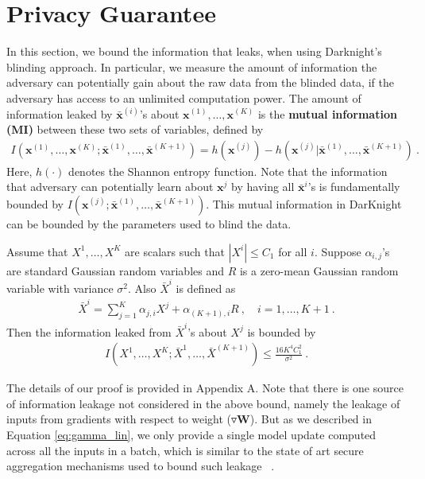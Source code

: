 \section{Privacy Guarantee}
\label{sec:guarantee}
In this section, we bound the information that leaks, when using Darknight's blinding approach. 
In particular, we measure the amount of information the adversary can potentially gain about the raw data from the blinded data, if the adversary has access to an unlimited computation power. The amount of information leaked by $\bar{\mathbf x}^{(i)}$'s about $\mathbf x^{(1)},\dots,\mathbf x^{(K)}$ is the \textbf{mutual information (MI)} between these two sets of variables, defined by~\citep{cover1999elements}
\begin{align}
    I(\mathbf x^{(1)},\dots,\mathbf x^{(K)} ; \bar{\mathbf x}^{(1)},\dots,\bar{\mathbf x}^{(K+1)})=h(\mathbf x^{(j)})-h(\mathbf x^{(j)} |\bar{\mathbf x}^{(1)},\dots,\bar{\mathbf x}^{(K+1)})~.
\end{align}
Here, $ h(\cdot)$ denotes the Shannon entropy function. Note that the information that adversary can potentially learn about $\mathbf x^j$ by having all $\bar{\mathbf x}^i$'s is fundamentally bounded by  $I(\mathbf x^{(j)} ; \bar{\mathbf x}^{(1)},\dots,\bar{\mathbf x}^{(K+1)})$.  This mutual information in DarKnight can be bounded by the parameters used to blind the data.
\begin{thm}\label{thm:info_leakage1}
Assume that $X^1,\dots,X^K$ are scalars such that $|X^i|\leq C_1$ for all $i$. Suppose $\alpha_{i,j}$'s are standard Gaussian random variables and $R$ is a zero-mean Gaussian random variable with variance $\sigma^2$. Also $\bar X^i$ is defined as
\begin{align}
    \bar X^i=\sum_{j=1}^K \alpha_{j,i} X^j + \alpha_{(K+1),i} R~,\quad i=1,\dots,K+1~.
\end{align}
Then the information leaked from $\bar X^i$'s about $X^j$ is bounded by
\begin{align}\label{eq:infor_bound}
    I\left(X^1,\dots,X^K ; \bar X^1,\dots,\bar X^{(K+1)}\right)\leq \frac{16 K^4 C_1^2}{\sigma^2}~.
\end{align}
\end{thm}
The details of our proof is provided in Appendix A. Note that there is one source of information leakage not considered in the above bound, namely the leakage of inputs from gradients with respect to weight ($\triangledown \mathbf W$). But as we described in Equation \ref{eq:gamma_lin}, we only provide a single model update computed across all the inputs in a batch, which is similar to the state of art secure aggregation mechanisms used to bound such leakage ~\citep{bonawitz2017practical, zhu2019deep}. 
